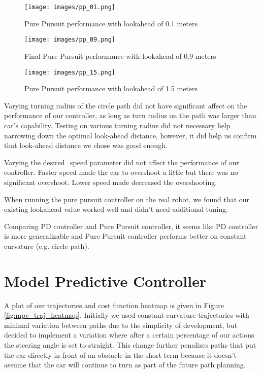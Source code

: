 \documentclass{article}
\begin{document}
\begin{figure}[!h]
  \texttt{[image: images/pp\_01.png]}
  \caption{Pure Pursuit performance with lookahead of 0.1 meters}
  \label{fig:pp_01}
\end{figure}

\begin{figure}
  \texttt{[image: images/pp\_09.png]}
  \caption{Final Pure Pursuit performance with lookahead of 0.9 meters}
  \label{fig:pp_09}
\end{figure}

\begin{figure}
  \texttt{[image: images/pp\_15.png]}
  \caption{Pure Pursuit performance with lookahead of 1.5 meters}
  \label{fig:pp_15}
\end{figure}


Varying turning radius of the circle path did not have significant affect 
on the performance of our controller, as long as turn radius on the path 
was larger than car's capability. Testing on various turning radius did 
not necessary help narrowing down the optimal look-ahead distance, 
however, it did help us confirm that look-ahead distance we chose 
was good enough.

Varying the desired\_speed parameter did not affect the performance of 
our controller. Faster speed made the car to overshoot a little but 
there was no significant overshoot. Lower speed made decreased 
the overshooting.

When running the pure pursuit controller on the real robot, we found that
our existing lookahead value worked well and didn't need additional tuning.

Comparing PD controller and Pure Pursuit controller, it seems like 
PD controller is more generalizable and Pure Pursuit controller 
performs better on constant curvature (e.g. circle path).

\newpage
\section{Model Predictive Controller}

A plot of our trajectories and cost function heatmap
is given in Figure \ref{fig:mpc_traj_heatmap}.
Initially we used constant curvature trajectories with minimal variation between
paths due to the simplicity of development, but decided to implement
a variation where after a certain percentage of our actions the steering
angle is set to straight. This change further penalizes paths that put the
car directly in front of an obstacle in the short term because it doesn't assume
that the car will continue to turn as part of the future path planning.
\end{document}

